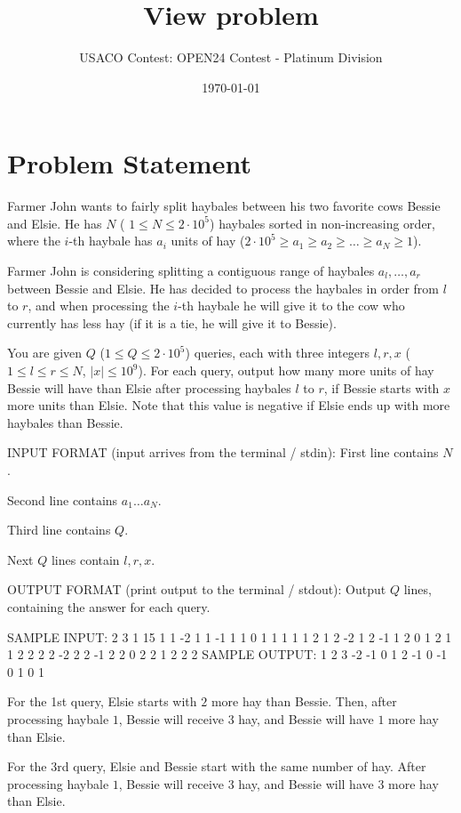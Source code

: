 \documentclass[12pt]{article}
\title{View problem}
\author{USACO Contest: OPEN24 Contest - Platinum Division}
\date{\today}
\begin{document}
\maketitle

\section*{Problem Statement}


Farmer John wants to fairly split haybales between his two favorite cows Bessie
and Elsie. He has $N$ ( $1\le N\le 2\cdot 10^5$) haybales sorted in
non-increasing order,  where the $i$-th haybale has $a_i$ units of hay
($2\cdot 10^5\ge a_1\ge a_2 \ge \dots \ge a_N \ge 1$).

Farmer John is considering splitting a contiguous range of haybales
$a_l, \dots, a_r$ between Bessie and Elsie. He has decided to process the
haybales in order from $l$ to $r$, and when processing the $i$-th haybale he
will give it to the cow who currently has less hay (if it is a tie, he will give
it to Bessie).

You are given $Q$ ($1\le Q\le 2\cdot 10^5$) queries, each with three integers
$l,r,x$ ($1\le l\le r\le N$, $|x|\le 10^9$). For each query, output how many
more units of hay Bessie will have than Elsie after processing haybales $l$ to
$r$, if Bessie starts with $x$ more units than Elsie. Note that this value is
negative if Elsie ends up with more haybales than Bessie. 

INPUT FORMAT (input arrives from the terminal / stdin):
First line contains $N$.

Second line contains $a_1\dots a_N$.

Third line contains $Q$.

Next $Q$ lines contain $l, r, x$.

OUTPUT FORMAT (print output to the terminal / stdout):
Output $Q$ lines, containing the answer for each query.

SAMPLE INPUT:
2
3 1
15
1 1 -2
1 1 -1
1 1 0
1 1 1
1 1 2
1 2 -2
1 2 -1
1 2 0
1 2 1
1 2 2
2 2 -2
2 2 -1
2 2 0
2 2 1
2 2 2
SAMPLE OUTPUT: 
1
2
3
-2
-1
0
1
2
-1
0
-1
0
1
0
1

For the 1st query, Elsie starts with $2$ more hay than Bessie. Then, after
processing haybale $1$, Bessie will receive $3$ hay, and Bessie will have $1$
more hay than Elsie. 

For the 3rd query, Elsie and Bessie start with the same number of hay. After
processing haybale $1$, Bessie will receive $3$ hay, and Bessie will have $3$
more hay than Elsie.
\end{document}
